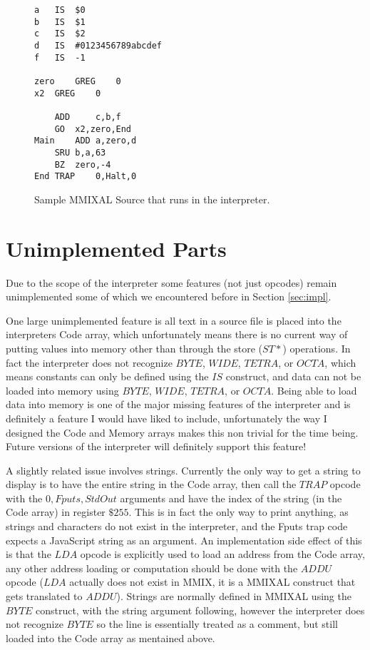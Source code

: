 \documentclass[conference]{IEEEtran}
\begin{document}
\begin{figure}
\begin{lstlisting}
a	IS	$0
b	IS	$1	
c	IS	$2
d	IS	#0123456789abcdef
f	IS 	-1

zero	GREG	0
x2	GREG	0
	
	ADD 	c,b,f
	GO 	x2,zero,End
Main	ADD	a,zero,d
	SRU	b,a,63
	BZ	zero,-4
End	TRAP 	0,Halt,0
\end{lstlisting}
\caption{Sample MMIXAL Source that runs in the interpreter.}
\label{fig:mmixal}
\end{figure}


\vspace{0.5cm}
\section{Unimplemented Parts}
\label{sec:unimp}

Due to the scope of the interpreter some features (not just opcodes) remain unimplemented some of which we encountered before in Section \ref{sec:impl}.

One large unimplemented feature is all text in a source file is placed into the interpreters Code array, which unfortunately means there is no current way of putting values into memory other than through the store ($ST*$) operations. In fact the interpreter does not recognize $BYTE$, $WIDE$, $TETRA$, or $OCTA$, which means constants can only be defined using the $IS$ construct, and data can not be loaded into memory using $BYTE$, $WIDE$, $TETRA$, or $OCTA$. Being able to load data into memory is one of the major missing features of the interpreter and is definitely a feature I would have liked to include, unfortunately the way I designed the Code and Memory arrays makes this non trivial for the time being. Future versions of the interpreter will definitely support this feature!

A slightly related issue involves strings. Currently the only way to get a string to display is to have the entire string in the Code array, then call the $TRAP$ opcode with the $0,Fputs,StdOut$ arguments and have the index of the string (in the Code array) in register $\$255$. This is in fact the only way to print anything, as strings and characters do not exist in the interpreter, and the Fputs trap code expects a JavaScript string as an argument. An implementation side effect of this is that the $LDA$ opcode is explicitly used to load an address from the Code array, any other address loading or computation should be done with the $ADDU$ opcode ($LDA$ actually does not exist in MMIX, it is a MMIXAL construct that gets translated to $ADDU$). Strings are normally defined in MMIXAL using the $BYTE$ construct, with the string argument following, however the interpreter does not recognize $BYTE$ so the line is essentially treated as a comment, but still loaded into the Code array as mentained above.
\end{document}
